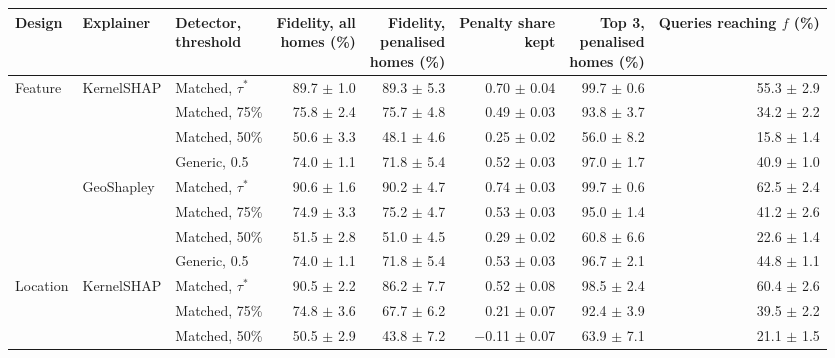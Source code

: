 \begin{table}[t]
\centering
\footnotesize
\setlength{\tabcolsep}{3.5pt}
\begin{adjustbox}{max width=\linewidth}
\begin{tabular}{lllrrrrr}
\toprule
Design & Explainer & \makecell[b]{Detector, \\ threshold} & \makecell[b]{Fidelity, all \\ homes (\%)} & \makecell[b]{Fidelity, \\ penalised \\ homes (\%)} & \makecell[b]{Penalty share \\ kept} & \makecell[b]{Top 3, \\ penalised \\ homes (\%)} & \makecell[b]{Queries \\ reaching $f$ \\ (\%)} \\
\midrule
Feature & KernelSHAP & Matched, $\tau^*$ & 89.7 $\pm$ 1.0 & 89.3 $\pm$ 5.3 & 0.70 $\pm$ 0.04 & 99.7 $\pm$ 0.6 & 55.3 $\pm$ 2.9 \\
 &  & Matched, 75\% & 75.8 $\pm$ 2.4 & 75.7 $\pm$ 4.8 & 0.49 $\pm$ 0.03 & 93.8 $\pm$ 3.7 & 34.2 $\pm$ 2.2 \\
 &  & Matched, 50\% & 50.6 $\pm$ 3.3 & 48.1 $\pm$ 4.6 & 0.25 $\pm$ 0.02 & 56.0 $\pm$ 8.2 & 15.8 $\pm$ 1.4 \\
 &  & Generic, 0.5 & 74.0 $\pm$ 1.1 & 71.8 $\pm$ 5.4 & 0.52 $\pm$ 0.03 & 97.0 $\pm$ 1.7 & 40.9 $\pm$ 1.0 \\
 & GeoShapley & Matched, $\tau^*$ & 90.6 $\pm$ 1.6 & 90.2 $\pm$ 4.7 & 0.74 $\pm$ 0.03 & 99.7 $\pm$ 0.6 & 62.5 $\pm$ 2.4 \\
 &  & Matched, 75\% & 74.9 $\pm$ 3.3 & 75.2 $\pm$ 4.7 & 0.53 $\pm$ 0.03 & 95.0 $\pm$ 1.4 & 41.2 $\pm$ 2.6 \\
 &  & Matched, 50\% & 51.5 $\pm$ 2.8 & 51.0 $\pm$ 4.5 & 0.29 $\pm$ 0.02 & 60.8 $\pm$ 6.6 & 22.6 $\pm$ 1.4 \\
 &  & Generic, 0.5 & 74.0 $\pm$ 1.1 & 71.8 $\pm$ 5.4 & 0.53 $\pm$ 0.03 & 96.7 $\pm$ 2.1 & 44.8 $\pm$ 1.1 \\
\midrule
Location & KernelSHAP & Matched, $\tau^*$ & 90.5 $\pm$ 2.2 & 86.2 $\pm$ 7.7 & 0.52 $\pm$ 0.08 & 98.5 $\pm$ 2.4 & 60.4 $\pm$ 2.6 \\
 &  & Matched, 75\% & 74.8 $\pm$ 3.6 & 67.7 $\pm$ 6.2 & 0.21 $\pm$ 0.07 & 92.4 $\pm$ 3.9 & 39.5 $\pm$ 2.2 \\
 &  & Matched, 50\% & 50.5 $\pm$ 2.9 & 43.8 $\pm$ 7.2 & $-$0.11 $\pm$ 0.07 & 63.9 $\pm$ 7.1 & 21.1 $\pm$ 1.5 \\

\end{tabular}
\end{adjustbox}
\end{table}
